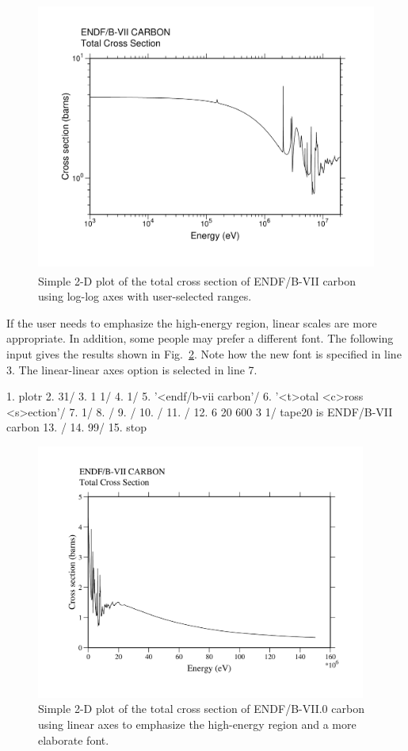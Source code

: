 \begin{figure}[b]\centering
\includegraphics[keepaspectratio, height=3.5in, angle=0]{figs/plotr2ack}
\caption[Sample 2-D plot with modified axes]{Simple 2-D plot of the
 total cross section of ENDF/B-VII carbon using log-log axes with
 user-selected ranges.}
\label{mod2d}
\end{figure}

If the user needs to emphasize the high-energy region, linear scales
are more appropriate.  In addition, some people may prefer a different
font.  The following input gives the results shown in Fig.~\ref{lin2d}.
Note how the new font is specified in line 3.  The linear-linear axes
option is selected in line 7.

\small
\begin{ccode}

  1.  plotr
  2.  31/
  3.  1 1/
  4.  1/
  5.  '<endf/b-vii carbon'/
  6.  '<t>otal <c>ross <s>ection'/
  7.  1/
  8.  /
  9.  /
 10.  /
 11.  /
 12.  6 20 600 3 1/ tape20 is ENDF/B-VII carbon
 13.  /
 14.  99/
 15.  stop

\end{ccode}
\normalsize

\begin{figure}[t]\centering
\includegraphics[keepaspectratio, height=3.3in, angle=0]{figs/plotr3ack}
\caption[Sample 2-D plot with linear axes]{Simple 2-D plot of the total
 cross section of ENDF/B-VII.0 carbon using linear axes to emphasize
 the high-energy region and a more elaborate font.}
\label{lin2d}
\end{figure}

